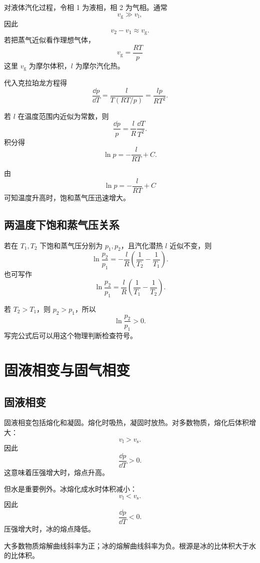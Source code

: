 对液体汽化过程，令相 1 为液相，相 2 为气相。通常
\[
  v_{\mathrm g}\gg v_{\mathrm l},
\]
因此
\[
  v_2-v_1\approx v_{\mathrm g}.
\]
若把蒸气近似看作理想气体，
\[
  v_{\mathrm g}=\frac{RT}{p}
\]
这里 \(v_{\mathrm g}\) 为摩尔体积，\(l\) 为摩尔汽化热。

代入克拉珀龙方程得
\[
  \frac{\dd p}{\dd T}
  =
  \frac{l}{T(RT/p)}
  =
  \boxed{
  \frac{lp}{RT^2}
  }.
\]

若 \(l\) 在温度范围内近似为常数，则
\[
  \frac{\dd p}{p}
  =
  \frac{l}{R}\frac{\dd T}{T^2}.
\]
积分得
\[
  \boxed{
  \ln p=-\frac{l}{RT}+C
  }.
\]

\begin{KeyBox}[饱和蒸气压随温度变化]
由
\[
  \ln p=-\frac{l}{RT}+C
\]
可知温度升高时，饱和蒸气压迅速增大。
\end{KeyBox}

\subsection{两温度下饱和蒸气压关系}

若在 \(T_1,T_2\) 下饱和蒸气压分别为 \(p_1,p_2\)，且汽化潜热 \(l\) 近似不变，则
\[
  \boxed{
  \ln\frac{p_2}{p_1}
  =
  -\frac{l}{R}
  \left(
  \frac{1}{T_2}-\frac{1}{T_1}
  \right)
  }.
\]
也可写作
\[
  \boxed{
  \ln\frac{p_2}{p_1}
  =
  \frac{l}{R}
  \left(
  \frac{1}{T_1}-\frac{1}{T_2}
  \right)
  }.
\]

\begin{WarnBox}[指数符号检查]
若 \(T_2>T_1\)，则 \(p_2>p_1\)，所以
\[
  \ln\frac{p_2}{p_1}>0.
\]
写完公式后可以用这个物理判断检查符号。
\end{WarnBox}

\section{固液相变与固气相变}

\subsection{固液相变}

固液相变包括熔化和凝固。熔化时吸热，凝固时放热。对多数物质，熔化后体积增大：
\[
  v_{\mathrm l}>v_{\mathrm s}.
\]
因此
\[
  \frac{\dd p}{\dd T}>0.
\]
这意味着压强增大时，熔点升高。

但水是重要例外。冰熔化成水时体积减小：
\[
  v_{\mathrm l}<v_{\mathrm s}.
\]
因此
\[
  \frac{\dd p}{\dd T}<0.
\]
压强增大时，冰的熔点降低。

\begin{WarnBox}[冰的熔解曲线斜率]
大多数物质熔解曲线斜率为正；冰的熔解曲线斜率为负。根源是冰的比体积大于水的比体积。
\end{WarnBox}

